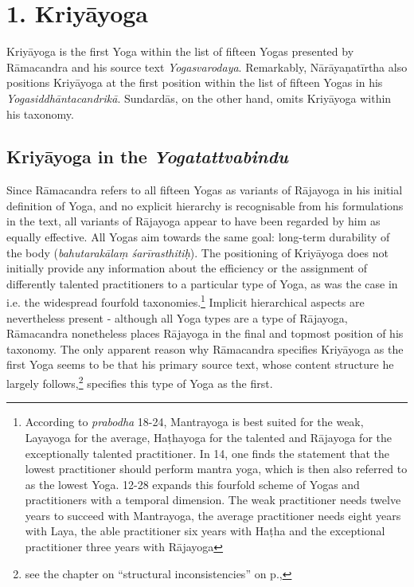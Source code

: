 \section{1. Kriyāyoga}

Kriyāyoga is the first Yoga within the list of fifteen Yogas presented by Rāmacandra and his source text \textit{Yogasvarodaya}. Remarkably, Nārāyaṇatīrtha also positions Kriyāyoga at the first position within the list of fifteen Yogas in his \textit{Yogasiddhāntacandrikā}. Sundardās, on the other hand, omits Kriyāyoga within his taxonomy.

\subsection{Kriyāyoga in the \textit{Yogatattvabindu}}

Since Rāmacandra refers to all fifteen Yogas as variants of Rājayoga in his initial definition of Yoga, and no explicit hierarchy is recognisable from his formulations in the text, all variants of Rājayoga appear to have been regarded by him as equally effective. All Yogas aim towards the same goal: long-term durability of the body (\textit{bahutarakālaṃ śarīrasthitiḥ}). The positioning of Kriyāyoga does not initially provide any information about the efficiency or the assignment of differently talented practitioners to a particular type of Yoga, as was the case in i.e. the widespread fourfold taxonomies.\footnote{According to \textit{prabodha} 18-24, Mantrayoga is best suited for the weak, Layayoga for the average, Haṭhayoga for the talented and Rājayoga for the exceptionally talented practitioner. In  14, one finds the statement that the lowest practitioner should perform mantra yoga, which is then also referred to as the lowest Yoga.  12-28 expands this fourfold scheme of Yogas and practitioners with a temporal dimension. The weak practitioner needs twelve years to succeed with Mantrayoga, the average practitioner needs eight years with Laya, the able practitioner six years with Haṭha and the exceptional practitioner three years with Rājayoga} Implicit hierarchical aspects are nevertheless present - although all Yoga types are a type of Rājayoga, Rāmacandra nonetheless places Rājayoga in the final and topmost position of his taxonomy.
The only apparent reason why Rāmacandra specifies Kriyāyoga as the first Yoga seems to be that his primary source text, whose content structure he largely follows,\footnote{see the chapter on ``structural inconsistencies'' on p.\pageref{struktur},} specifies this type of Yoga as the first.

